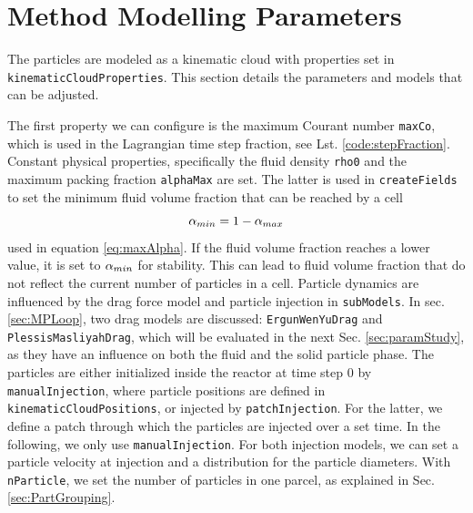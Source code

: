 \section{\OF \MP Method Modelling Parameters}
The particles are modeled as a kinematic cloud with properties set in \lstinline|kinematicCloudProperties|.
This section details the parameters and models that can be adjusted.

The first property we can configure is the maximum Courant number \lstinline|maxCo|, which is used in the Lagrangian time step fraction, see Lst. \ref{code:stepFraction}.
Constant physical properties, specifically the fluid density \lstinline|rho0| and the maximum packing fraction \lstinline|alphaMax| are set. 
The latter is used in \lstinline|createFields| to set the minimum fluid volume fraction that can be reached by a cell
\begin{equation*}
    \alpha_{min} = 1- \alpha_{max}
\end{equation*}
used in equation \eqref{eq:maxAlpha}. If the fluid volume fraction reaches a lower value, it is set to $\alpha_{min}$ for stability. This can lead to fluid volume fraction that do not reflect the current number of particles in a cell.
Particle dynamics are influenced by the drag force model and particle injection in \lstinline|subModels|. 
In sec. \ref{sec:MPLoop}, two drag models are discussed: \lstinline|ErgunWenYuDrag| and \lstinline|PlessisMasliyahDrag|, which will be evaluated in the next Sec. \ref{sec:paramStudy}, as they have an influence on both the fluid and the solid particle phase.
The particles are either initialized inside the reactor at time step $0$ by \lstinline|manualInjection|, where particle positions are defined in \lstinline|kinematicCloudPositions|, or injected by \lstinline|patchInjection|.
For the latter, we define a patch through which the particles are injected over a set time.
In the following, we only use \lstinline|manualInjection|.
For both injection models, we can set a particle velocity at injection and a distribution for the particle diameters.
With \lstinline|nParticle|, we set the number of particles in one parcel, as explained in Sec. \ref{sec:PartGrouping}.

